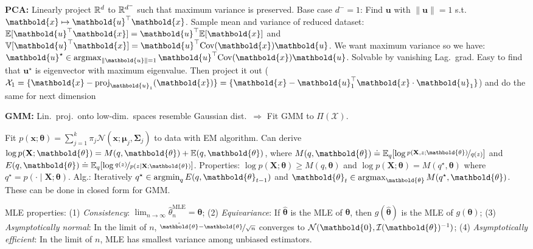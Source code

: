 \documentclass[9pt]{extarticle}
\newenvironment{topic}[1]
{\textbf{\sffamily \colorbox{black}{\rlap{\textbf{\textcolor{white}{#1}}}\hspace{\linewidth}\hspace{-2\fboxsep}}}}
{}
\newenvironment{subtopic}[1]
{\textbf{\sffamily #1:}}
{}
\renewcommand{\mat}[1]{\ensuremath{\mathbf{#1}}}
\renewcommand{\vec}[1]{\ensuremath{\mathbold{#1}}}
\renewcommand{\Var}{\mathbb{V}}
\begin{document}
\begin{multicols*}{3}
\begin{topic}{Anomaly detection}
\begin{subtopic}{PCA}
            Linearly project $\mathbb{R}^d$ to $\mathbb{R}^{d^-}$ such that maximum variance is preserved. Base case $d^- = 1$:
            Find $\vec{u}$ with $\| \vec{u} \| = 1$ s.t.\ $\vec{x} \mapsto \transpose{\vec{u}} \vec{x}$. Sample
            mean and variance of reduced dataset: $\E[\transpose{\vec{u}} \vec{x}] = \transpose{\vec{u}}
                \E[\vec{x}]$ and $\Var[\transpose{\vec{u}} \vec{x}] = \transpose{\vec{u}} \mathrm{Cov}(\vec{x})
                \vec{u}$. We want maximum variance so we have: $\vec{u}^\star \in \argmax_{\| \vec{u} \|=1}
                \transpose{\vec{u}} \mathrm{Cov}(\vec{x}) \vec{u}$. Solvable by vanishing Lag.\ grad. Easy to find
            that $\vec{u}^\star$ is eigenvector with maximum eigenvalue. Then project it out ($\mathcal{X}_1 =
                \{ \vec{x} - \mathrm{proj}_{\vec{u}_1}(\vec{x}) \} = \{ \vec{x} - \transpose{\vec{u}_1} \vec{x}
                \cdot \vec{u}_1 \}$) and do the same for next dimension

        \end{subtopic}

        \begin{subtopic}{GMM}
            Lin.\ proj.\ onto low-dim.\ spaces resemble Gaussian dist.\ $\Rightarrow$ Fit
            GMM to $\Pi(\mathcal{X})$.

            Fit $p(\vec{x}; \vec{\theta}) = \sum_{j=1}^{k} \pi_j \mathcal{N}(\vec{x}; \vec{\mu}_j,
                \mat{\Sigma}_j)$ to data with EM algorithm. Can derive $\log p(\mat{X}; \vec{\theta}) = M(q,
                \vec{\theta}) + \E(q, \vec{\theta})$, where $M(q, \vec{\theta}) \doteq \E_q [\log
                    \nicefrac{p(\mat{X},z; \vec{\theta})}{q(z)}]$ and $E(q, \vec{\theta}) \doteq \E_q [\log
                    \nicefrac{q(z)}{p(z \mid \mat{X}; \vec{\theta})}]$. Properties: $\log p(\mat{X}; \vec{\theta}) \geq
                M(q, \vec{\theta})$ and $\log p(\mat{X}; \vec{\theta}) = M(q^\star, \vec{\theta})$ where $q^\star =
                p(\cdot \mid \mat{X}; \vec{\theta})$. Alg.: Iteratively $q^\star \in \argmin_q E(q,
                \vec{\theta}_{t-1})$ and $\vec{\theta}_t \in \argmax_{\vec{\theta}} M(q^\star, \vec{\theta})$.
            These can be done in closed form for GMM.

        \end{subtopic}

    \end{topic}

    \begin{topic}{Density estimation}
        MLE properties: (1) \textit{Consistency}: $\lim_{n\to\infty} \hat{\theta}^{\mathrm{MLE}}_n =
            \vec{\theta}$; (2) \textit{Equivariance}: If $\hat{\vec{\theta}}$ is the MLE of $\vec{\theta}$,
        then $g(\hat{\vec{\theta}})$ is the MLE of $g(\vec{\theta})$; (3) \textit{Asymptotically normal}:
        In the limit of $n$, $\nicefrac{\hat{\vec{\theta}} - \vec{\theta}}{\sqrt{n}}$ converges to
        $\mathcal{N}(\vec{0}, \inv{\mathcal{I}(\vec{\theta})})$; (4) \textit{Asymptotically efficient}: In
        the limit of $n$, MLE has smallest variance among unbiased estimators.


\end{topic}
\end{multicols*}
\end{document}
